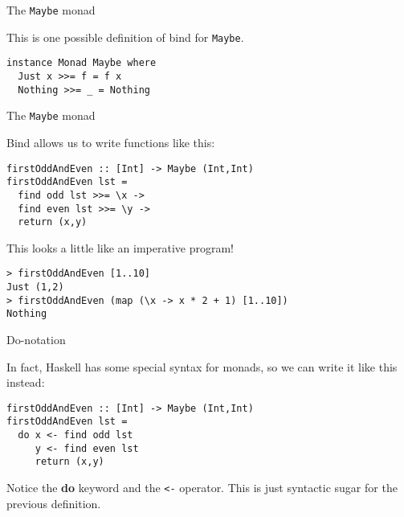 %
\begin{frame}[fragile]{The \texttt{Maybe} monad}

This is one possible definition of bind for \texttt{Maybe}.

\begin{block}{}
\begin{verbatim}
instance Monad Maybe where
  Just x >>= f = f x
  Nothing >>= _ = Nothing
\end{verbatim}
\end{block}

\end{frame}

%
\begin{frame}[fragile]{The \texttt{Maybe} monad}

Bind allows us to write functions like this:

\begin{block}{}
\begin{verbatim}
firstOddAndEven :: [Int] -> Maybe (Int,Int)
firstOddAndEven lst = 
  find odd lst >>= \x ->
  find even lst >>= \y ->
  return (x,y)
\end{verbatim}
\end{block}

This looks a little like an imperative program!

\begin{block}{}
\begin{verbatim}
> firstOddAndEven [1..10]
Just (1,2)
> firstOddAndEven (map (\x -> x * 2 + 1) [1..10])
Nothing
\end{verbatim}
\end{block}

\end{frame}

%
\begin{frame}[fragile]{Do-notation}

In fact, Haskell has some special syntax for monads, so we can write it like
this instead:

\begin{block}{}
\begin{verbatim}
firstOddAndEven :: [Int] -> Maybe (Int,Int)
firstOddAndEven lst = 
  do x <- find odd lst
     y <- find even lst
     return (x,y)
\end{verbatim}
\end{block}

Notice the \textbf{do} keyword and the \texttt{<-} operator. This is just
syntactic sugar for the previous definition.

\end{frame}

